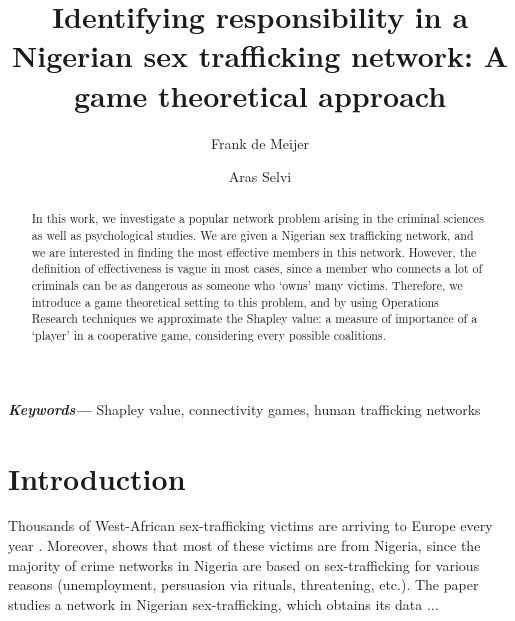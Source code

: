 \documentclass[11p]{article}
\makeatletter
\newcommand{\reqnomode}{\tagsleft@false\let\veqno\@@eqno}
\providecommand{\keywords}[1]{\textbf{\textit{Keywords---}} #1} %
\theoremstyle{definition}
\theoremstyle{definition}
\theoremstyle{theorm}
\makeatother
\begin{document}
\setlength{\droptitle}{-4em}   %

\title{Identifying responsibility in a Nigerian sex trafficking network: A game theoretical approach}
\author[1]{Frank de Meijer}
\author[2]{Aras Selvi}

\date{}

\maketitle

\begin{abstract} \noindent
In this work, we investigate a popular network problem arising in the criminal sciences as well as psychological studies. We are given a Nigerian sex trafficking network, and we are interested in finding the most effective members in this network. However, the definition of effectiveness is vague in most cases, since a member who connects a lot of criminals can be as dangerous as someone who `owns' many victims. Therefore, we introduce a game theoretical setting to this problem, and by using Operations Research techniques we approximate the Shapley value: a measure of importance of a `player' in a cooperative game, considering every possible coalitions. 
\end{abstract}
\keywords{Shapley value, connectivity games, human trafficking networks}

\reqnomode

\section{Introduction}
Thousands of West-African sex-trafficking victims are arriving to Europe every year \cite{morselli2009inside}. Moreover, \cite{olagbegi2006human} shows that most of these victims are from Nigeria, since the majority of crime networks in Nigeria are based on sex-trafficking for various reasons (unemployment, persuasion via rituals, threatening, etc.). The paper \cite{mancuso2014not} studies a network in Nigerian sex-trafficking, which obtains its data $\ldots$
\end{document}
